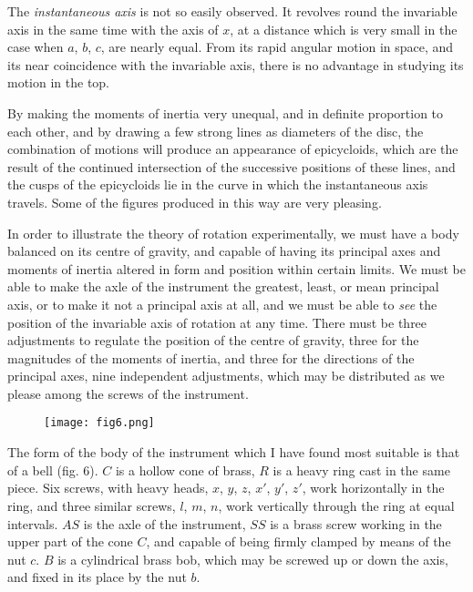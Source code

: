 \documentclass[12pt]{article}
\begin{document}
\footnotemark[1]The \emph{instantaneous axis} is not so easily
observed.  It revolves round the invariable axis in the same time with
the axis of $x$, at a distance which is very small in the case when
$a$, $b$, $c$, are nearly equal.  From its rapid angular motion in
space, and its near coincidence with the invariable axis, there is no
advantage in studying its motion in the top.

\footnotemark[1]By making the moments of inertia very unequal, and in
definite proportion to each other, and by drawing a few strong lines
as diameters of the disc, the combination of motions will produce an
appearance of epicycloids, which are the result of the continued
intersection of the successive positions of these lines, and the cusps
of the epicycloids lie in the curve in which the instantaneous axis
travels.  Some of the figures produced in this way are very pleasing.

In order to illustrate the theory of rotation experimentally, we must
have a body balanced on its centre of gravity, and capable of having
its principal axes and moments of inertia altered in form and position
within certain limits.  We must be able to make the axle of the
instrument the greatest, least, or mean principal axis, or to make it
not a principal axis at all, and we must be able to \emph{see} the
position of the invariable axis of rotation at any time.  There must
be three adjustments to regulate the position of the centre of
gravity, three for the magnitudes of the moments of inertia, and three
for the directions of the principal axes, nine independent
adjustments, which may be distributed as we please among the screws of
the instrument.

\begin{figure}
\begin{center}
\texttt{[image: fig6.png]}
\end{center}
\caption{}
\end{figure}

The form of the body of the instrument which I have found most
suitable is that of a bell (fig.  6).  $C$ is a hollow cone of brass,
$R$ is a heavy ring cast in the same piece.  Six screws, with heavy
heads, $x$, $y$, $z$, $x'$, $y'$, $z'$, work horizontally in the ring,
and three similar screws, $l$, $m$, $n$, work vertically through the
ring at equal intervals.  $AS$ is the axle of the instrument, $SS$ is
a brass screw working in the upper part of the cone $C$, and capable
of being firmly clamped by means of the nut $c$.  $B$ is a cylindrical
brass bob, which may be screwed up or down the axis, and fixed in its
place by the nut $b$.
\end{document}

